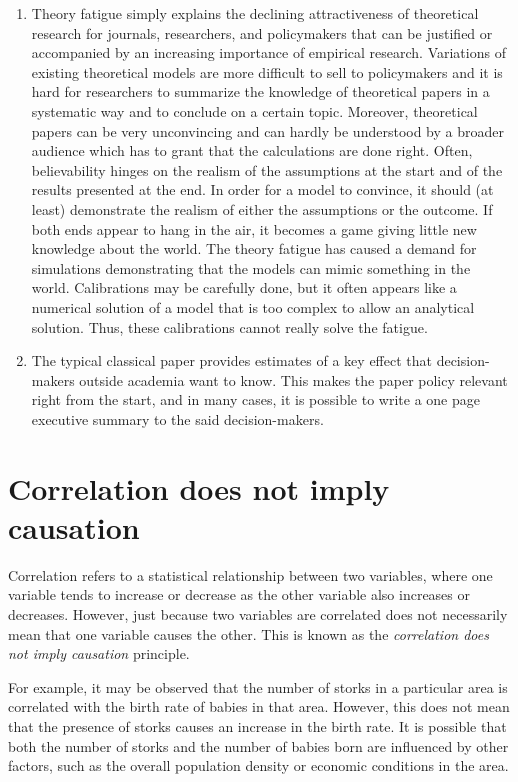 \documentclass[
  12pt,
  oneside]{book}
\theoremstyle{definition}
\theoremstyle{definition}
\theoremstyle{definition}
\theoremstyle{definition}
\theoremstyle{remark}
\begin{document}
\begin{enumerate}
\def\labelenumi{\alph{enumi})}
\setcounter{enumi}{2}
\item
  Theory fatigue simply explains the declining attractiveness of theoretical research for journals, researchers, and policymakers that can be justified or accompanied by an increasing importance of empirical research. Variations of existing theoretical models are more difficult to sell to policymakers and it is hard for researchers to summarize the knowledge of theoretical papers in a systematic way and to conclude on a certain topic. Moreover, theoretical papers can be very unconvincing and can hardly be understood by a broader audience which has to grant that the calculations are done right. Often, believability hinges on the realism of the assumptions at the start and of the results presented at the end. In order for a model to convince, it should (at least) demonstrate the realism of either the assumptions or the outcome. If both ends appear to hang in the air, it becomes a game giving little new knowledge about the world. The theory fatigue has caused a demand for simulations demonstrating that the models can mimic something in the world. Calibrations may be carefully done, but it often appears like a numerical solution of a model that is too complex to allow an analytical solution. Thus, these calibrations cannot really solve the fatigue.
\item
  The typical classical paper provides estimates of a key effect that decision-makers outside
  academia want to know. This makes the paper policy relevant right from the start, and in
  many cases, it is possible to write a one page executive summary to the said decision-makers.
\end{enumerate}

\hypertarget{correlation-does-not-imply-causation}{%
\section{Correlation does not imply causation}\label{correlation-does-not-imply-causation}}

Correlation refers to a statistical relationship between two variables, where one variable tends to increase or decrease as the other variable also increases or decreases. However, just because two variables are correlated does not necessarily mean that one variable causes the other. This is known as the \emph{correlation does not imply causation} principle.

For example, it may be observed that the number of storks in a particular area is correlated with the birth rate of babies in that area. However, this does not mean that the presence of storks causes an increase in the birth rate. It is possible that both the number of storks and the number of babies born are influenced by other factors, such as the overall population density or economic conditions in the area.
\end{document}

